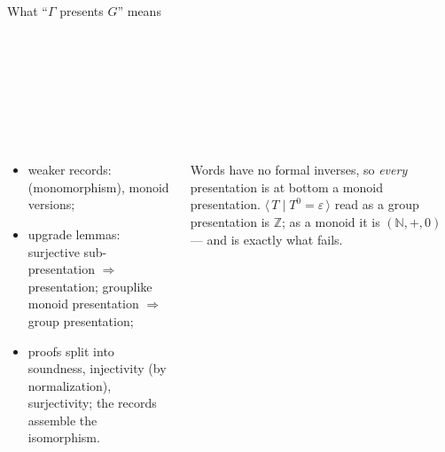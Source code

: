 \begin{frame}{What ``$\Gamma$ presents $G$'' means \InPaper}
\begin{code}[hide]
%
\>[2]%
\>[13]\AgdaSymbol{:}\AgdaSpace{}%
\AgdaSpace{}%
\AgdaSpace{}%
\AgdaSpace{}%
\<%
\\
%
\>[2]%
\>[13]\AgdaSymbol{:}\AgdaSpace{}%
\AgdaSpace{}%
\AgdaSpace{}%
\AgdaSpace{}%
\AgdaSpace{}%
\<%
\\
%
\>[2]\AgdaSpace{}%
\AgdaSymbol{:}\AgdaSpace{}%
\<%
\\
%
\>[2]%
\>[13]\AgdaSymbol{:}\AgdaSpace{}%
\AgdaSpace{}%
\AgdaSpace{}%
\AgdaSpace{}%
\<%
\\
%
\>[2]%
\>[13]\AgdaSymbol{:}\AgdaSpace{}%
\<%
\\
%
\>[2]%
\>[13]\AgdaSymbol{:}\AgdaSpace{}%
\AgdaSpace{}%
\AgdaSpace{}%
\AgdaSpace{}%
\<%
\\
%
\>[2]%
\>[13]\AgdaSymbol{:}\AgdaSpace{}%
\AgdaSpace{}%
\AgdaSpace{}%
\AgdaSpace{}%
\AgdaSpace{}%
\<%
\end{code}
\begin{columns}[c]
\begin{column}{0.54\textwidth}
\small
\begin{itemize}
  \item weaker records:  (monomorphism), monoid versions;
  \item upgrade lemmas: surjective sub-presentation $\Rightarrow$ presentation;
        grouplike monoid presentation $\Rightarrow$ group presentation;
  \item proofs split into soundness, injectivity (by normalization),
        surjectivity; the records assemble the isomorphism.
\end{itemize}
\end{column}
\begin{column}{0.43\textwidth}
\begin{keybox}[title=Monoid vs group: a real distinction]
\small Words have no formal inverses, so \emph{every} presentation is at
bottom a monoid presentation. $\langle\, T \mid T^{0} = \varepsilon\,\rangle$
read as a group presentation is $\mathbb{Z}$; as a \alert{monoid} it is
$(\mathbb{N},+,0)$ --- and  is exactly what fails.
\end{keybox}
\end{column}
\end{columns}
\end{frame}

